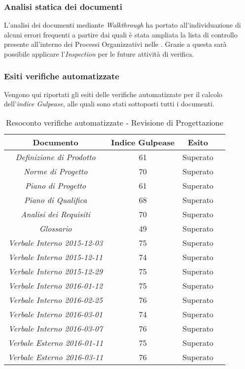 \subsubsection{Analisi statica dei documenti}
L'analisi dei documenti mediante \textit{Walkthrough} ha portato all'individuazione di alcuni errori frequenti a partire dai quali è stata ampliata la lista di controllo presente all'interno dei Processi Organizzativi nelle \textit{\NdP}. Grazie a questa sarà possibile applicare l'\textit{Inspection} per le future attività di verifica.

\subsubsection{Esiti verifiche automatizzate}
Vengono qui riportati gli esiti delle verifiche automatizzate per il calcolo dell'\textit{indice Gulpease}, alle quali sono stati sottoposti tutti i documenti.
\begin{table}[h]
\begin{center}
\begin{tabular}{|c|c|c|c|}
\hline \textbf{Documento} & \textbf{Indice Gulpease} & \textbf{Esito}\\
\hline
\emph{Definizione di Prodotto} & 61 & Superato \\
\emph{Norme di Progetto} & 70 & Superato \\
\emph{Piano di Progetto} & 61 & Superato \\
\emph{Piano di Qualifica} & 68 & Superato \\
\emph{Analisi dei Requisiti} & 70 & Superato \\
\emph{Glossario} & 49 & Superato \\
\emph{Verbale Interno 2015-12-03} & 75 & Superato \\
\emph{Verbale Interno 2015-12-11} & 74 & Superato \\
\emph{Verbale Interno 2015-12-29} & 75 & Superato \\
\emph{Verbale Interno 2016-01-12} & 75 & Superato \\
\emph{Verbale Interno 2016-02-25} & 76 & Superato \\
\emph{Verbale Interno 2016-03-01} & 74 & Superato \\
\emph{Verbale Interno 2016-03-07} & 76 & Superato \\
\emph{Verbale Esterno 2016-01-11} & 75 & Superato \\
\emph{Verbale Esterno 2016-03-11} & 76 & Superato \\
\hline
\end{tabular}
\caption{Resoconto verifiche automatizzate - Revisione di Progettazione}
\end{center}
\end{table}

